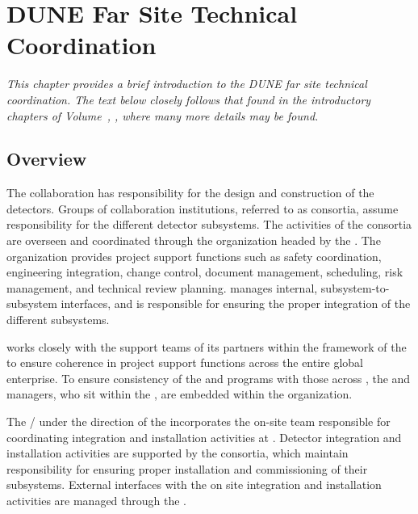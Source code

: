 \chapter{DUNE Far Site Technical Coordination}
\label{ch:exec-tc}

\textit{This chapter provides a brief introduction to the DUNE far site technical coordination.  The text below closely follows that found in the introductory chapters of Volume~\volnumbertc{}, \voltitletc{}, where many more details may be found.}

\section{Overview}   %


The  collaboration has  responsibility for the design 
and construction of the  detectors.  Groups of collaboration 
institutions, referred to as consortia, assume responsibility for 
the different detector subsystems.  The activities of the consortia are 
overseen and coordinated through the   organization 
headed by the  .  The  organization 
provides project support functions such as safety coordination, 
engineering integration, change control, document management, scheduling, 
risk management, and technical review planning.    
manages internal, subsystem-to-subsystem interfaces, and is responsible 
for ensuring the proper integration of the different subsystems.   


  works closely with the support teams of its 
 partners within the framework of the  to 
ensure coherence in project support functions across the entire global 
enterprise.  To ensure consistency of the   
and  programs with those across , the 
  and  managers, who sit within 
the , are embedded within the   
organization.  

The /  under the 
direction of the  incorporates the on-site team responsible 
for coordinating integration and installation activities at .
Detector integration and installation activities are supported by the
 consortia, which maintain responsibility for ensuring
proper installation and commissioning of their subsystems.  External
 interfaces with the on site integration and installation
activities are managed through the . 


